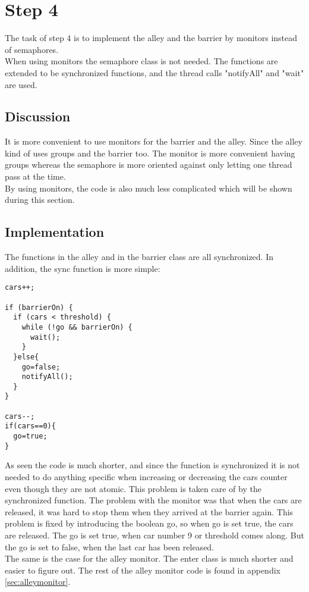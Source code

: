 \section{Step 4}
The task of step 4 is to implement the alley and the barrier by monitors instead of semaphores. \\
When using monitors the semaphore class is not needed. The functions are extended to be synchronized functions, and the thread calls "notifyAll" and "wait" are used.

\subsection{Discussion}
It is more convenient to use monitors for the barrier and the alley. Since the alley kind of uses groups and the barrier too. The monitor is more convenient having groups whereas the semaphore is more oriented against only letting one thread pass at the time. \\
By using monitors, the code is also much less complicated which will be shown during this section.

\subsection{Implementation}
The functions in the alley and in the barrier class are all synchronized. In addition, the sync function is more simple: 

\begin{lstlisting}
cars++;

if (barrierOn) {
  if (cars < threshold) {
    while (!go && barrierOn) {
      wait();	
    }
  }else{
    go=false;
    notifyAll();
  }
} 

cars--;
if(cars==0){
  go=true;
}
\end{lstlisting}
\vspace{.8cm}

As seen the code is much shorter, and since the function is synchronized it is not needed to do anything specific when increasing or decreasing the cars counter even though they are not atomic. This problem is taken care of by the synchronized function. The problem with the monitor was that when the cars are released, it was hard to stop them when they arrived at the barrier again. This problem is fixed by introducing the boolean go, so when go is set true, the cars are released. The go is set true, when car number 9 or threshold comes along. But the go is set to false, when 
the last car has been released. 
\\

The same is the case for the alley monitor. The enter class is much shorter and easier to figure out. The rest of the alley monitor code is found in appendix \ref{sec:alleymonitor}. 